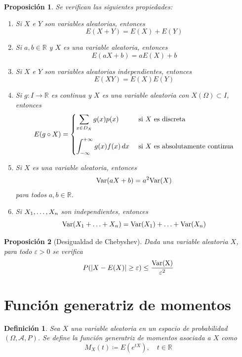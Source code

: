 \documentclass[11pt]{report}
\newtheorem{proposition}{Proposición}
\newtheorem{definition}{Definición}
\theoremstyle{definition}
\newcommand{\R}{\mathbb R}
\begin{document}
\begin{proposition}
    Se verifican las siguientes propiedades:
    \begin{enumerate}
        \item Si $X$ e $Y$ son variables aleatorias, entonces \[E(X+Y) = E(X)+E(Y)\]
        \item Si $a,b \in \R$ y $X$ es una variable aleatoria, entonces  \[E(aX+b) = aE(X)+b\]
        \item Si $X$ e $Y$ son variables aleatorias independientes, entonces \[E(XY) = E(X)E(Y)\]
        \item Si $g \colon I \to \R$ es continua y $X$ es una variable aleatoria con $X(\Omega) \subset I$, entonces
\[E(g \circ X)=\begin{cases}
    \displaystyle \sum_{x \in D_X}g(x)p(x) & $ si $ X $ es discreta$ \\[20pt]
    \displaystyle\int_{-\infty}^{+\infty} g(x)f(x) \, dx & $ si $ X $ es absolutamente continua$ \\
\end{cases}\]
        \item Si $X$ es una variable aleatoria, entonces \[\textup{Var}(aX+b) = a^2 \textup{Var}(X)\]
            para todos $a,b \in \R$.
        \item Si $X_1,\mathellipsis,X_n$ son independientes, entonces
    \[\textup{Var}(X_1+\mathellipsis+X_n) = \textup{Var}(X_1)+\mathellipsis+\textup{Var}(X_n)\]
    \end{enumerate}
\end{proposition}

\begin{proposition}[Desigualdad de Chebyshev]
Dada una variable aleatoria $X$, para todo $\varepsilon>0$ se verifica
\[P(|X-E(X)| \geq \varepsilon) \leq \frac{\textup{Var(X)}}{\varepsilon^2}\]
\end{proposition}

\section{Función generatriz de momentos}

\begin{definition}
Sea $X$ una variable aleatoria en un espacio de probabilidad $(\Omega,\mathcal{A},P)$. Se define la \emph{función generatriz de momentos asociada a $X$} como 
\[M_X(t)\coloneqq E(e^{tX}), \quad t \in \R\]
\end{definition}
\end{document}
